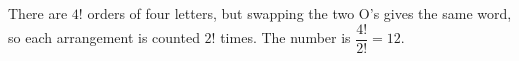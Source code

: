 There are $4!$ orders of four letters, but swapping the two O's gives the same word, so each arrangement is counted $2!$ times. The number is $\dfrac{4!}{2!}=\boxed{12}$.
